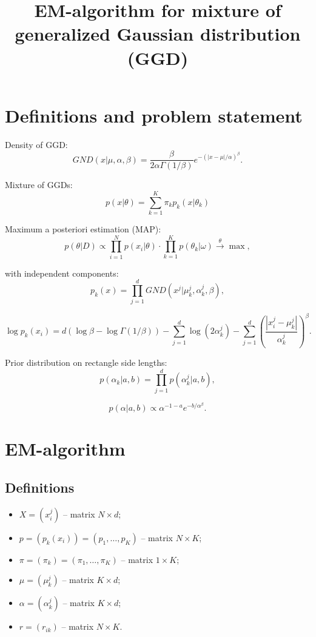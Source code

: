 \documentclass[12pt]{article}
\title{EM-algorithm for mixture of generalized Gaussian distribution (GGD)}
\author{}
\date{}
\theoremstyle{definition}
\theoremstyle{plain}
\begin{document}
\maketitle
\thispagestyle{empty}

\section{Definitions and problem statement}
Density of GGD:
$$
GND(x | \mu, \alpha, \beta) = \frac{\beta}{2 \alpha \Gamma(1/\beta)} 
e^{-(|x - \mu|/\alpha)^{\beta}}.
$$

Mixture of GGDs:
$$
p(x | \theta) = \sum_{k = 1}^{K} \pi_k p_k(x | \theta_k)
$$

Maximum a posteriori estimation (MAP):
$$
p(\theta | D) \propto 
\prod_{i = 1}^N p(x_i | \theta) \cdot 
\prod_{k = 1}^K p(\theta_k | \omega) \xrightarrow{\theta} \max,
$$

with independent components:
$$
p_k(x) = \prod_{j = 1}^{d} GND(x^j | \mu^j_k, \alpha^j_k, \beta),
$$

$$
\log p_k(x_i) = d \left( \log \beta - \log \Gamma(1 / \beta)\right) - 
\sum_{j=1}^d \log (2 \alpha_k^j) - 
\sum_{j=1}^d \left( \frac{|x_i^j - \mu_k^j|}{\alpha_k^j} \right)^\beta .
$$

Prior distribution on rectangle side lengths:
$$
p(\alpha_k | a, b) = \prod_{j = 1}^d p(\alpha^j_k | a, b),
$$

$$
p(\alpha | a, b) \propto \alpha^{-1 - a} e^{-b / \alpha^\beta}.
$$

\section{EM-algorithm}

\subsection{Definitions}
\begin{itemize}
\item $X = (x_i^j)$ -- matrix $N \times d$;
\item $p = (p_k(x_i)) = (p_1, \ldots, p_K)$ -- matrix $N \times K$;
\item $\pi = (\pi_k) = (\pi_1, \ldots, \pi_K)$ -- matrix $1 \times K$;
\item $\mu = (\mu_k^j)$ -- matrix $K \times d$;
\item $\alpha = (\alpha_k^j)$ -- matrix $K \times d$;
\item $r = (r_{ik})$ -- matrix $N \times K$.
\end{itemize}
\end{document}
